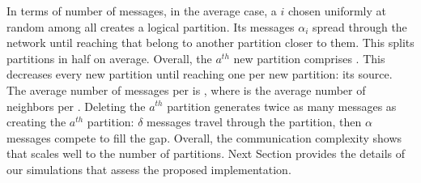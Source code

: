 In terms of number of messages, in the average case, a \process $i$
chosen uniformly at random among all \processes creates a logical
partition. Its messages $\alpha_i$ spread through the network until
reaching \processes that belong to another partition closer to
them. This splits partitions in half on average. Overall, the $a^{th}$
new partition comprises  \processes. This decreases every new
partition until reaching one \process per new partition: its
source. The average number of messages per \process is
, where  is the average
number of neighbors per \process.
Deleting the $a^{th}$ partition generates twice as many messages as
creating the $a^{th}$ partition: $\delta$ messages travel through the
partition, then $\alpha$ messages compete to fill the gap.  Overall,
the communication complexity shows that \NAME scales well to the
number of partitions.
Next Section provides the details of our simulations that assess the
proposed implementation.

